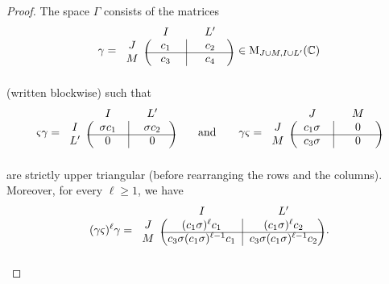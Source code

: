 \documentclass[11pt]{article}
\theoremstyle{definition}
\numberwithin{equation}{section}
\newcommand{\Mat}{\mathrm{M}}
\newcommand{\mC}{\mathbb{C}}
\begin{document}
\begin{proof}
The space $\Gamma$ consists of the matrices
\begin{equation}
\label{gamma}
\gamma=\begin{blockarray}{ccc}
{} & {\quad I\quad} & {\quad L'\quad}\\
\begin{block}{c(c|c)}
J & c_1 & c_2\\
\cline{2-3}
M & c_3 & c_4\\ \end{block}
\end{blockarray}
\,\in \Mat_{J\cup M,I\cup L'}(\mC)
\end{equation}
(written blockwise) such that
\begin{equation}
\label{zeta-gamma}
\varsigma \gamma=\begin{blockarray}{ccc}
{} & {\quad I\quad} & {\quad L'\quad}\\
\begin{block}{c(c|c)}
I & \sigma c_1 & \sigma c_2\\
\cline{2-3}
L' & 0 & 0\\ \end{block}
\end{blockarray}
\qquad\mbox{and}\qquad \gamma\varsigma=\begin{blockarray}{ccc}
{} & {\quad J\quad} & {\quad M\quad}\\
\begin{block}{c(c|c)}
J & c_1\sigma & 0\\
\cline{2-3}
M & c_3\sigma & 0\\ \end{block}
\end{blockarray}\end{equation}
are strictly upper triangular (before rearranging the rows and the columns).
Moreover, for every $\ell\geq 1$, we have
\begin{equation}
\label{powers2}
(\gamma\varsigma)^\ell\gamma=\begin{blockarray}{ccc}
{} & {\quad I\quad} & {\quad L'\quad}\\
\begin{block}{c(c|c)}
J & (c_1\sigma)^\ell c_1 & (c_1\sigma)^\ell c_2\\
\cline{2-3}
M & c_3\sigma(c_1\sigma)^{\ell-1}c_1 & c_3\sigma(c_1\sigma)^{\ell-1}c_2\\ \end{block}
\end{blockarray}\,.
\end{equation}


\end{proof}
\end{document}
